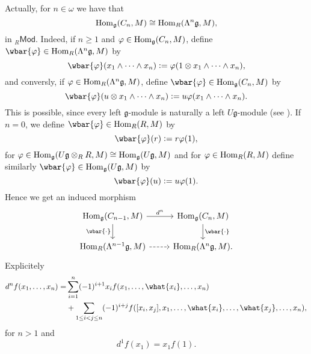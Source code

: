 \begin{remark}
	Actually, for $n \in \omega$ we have that 
	\begin{equation*}
		\operatorname{Hom}_\mathfrak{g}(C_n,M) \cong \operatorname{Hom}_R(\Lambda^n \mathfrak{g},M),
	\end{equation*}
	\noindent in $_{R}\mathsf{Mod}$. Indeed, if $n \geq 1$ and $\varphi \in \operatorname{Hom}_\mathfrak{g}(C_n,M)$, define $\wbar{\varphi} \in \Hom_R(\Lambda^n \mathfrak{g},M)$ by 
	\begin{equation*}
		\wbar{\varphi}(x_1 \wedge \dots \wedge x_n) := \varphi(1 \otimes x_1 \wedge \dots \wedge x_n),
	\end{equation*}
	\noindent and conversly, if $\varphi \in \operatorname{Hom}_R(\Lambda^n \mathfrak{g},M)$, define $\wbar{\varphi} \in \Hom_\mathfrak{g}(C_n,M)$ by
	\begin{equation*}
		\wbar{\varphi}(u \otimes x_1 \wedge \dots \wedge x_n) := u \varphi(x_1 \wedge \dots \wedge x_n).
	\end{equation*}
	\noindent This is possible, since every left $\mathfrak{g}$-module is naturally a left $U\mathfrak{g}$-module (see \cite[224--225]{weibel:homological_algebra:1994}). If $n = 0$, we define $\wbar{\varphi} \in \Hom_R(R,M)$ by 
	\begin{equation*}
		\wbar{\varphi}(r) := r\varphi(1),
	\end{equation*}
	\noindent for $\varphi \in \operatorname{Hom}_\mathfrak{g}(U\mathfrak{g} \otimes_R R,M) \cong \operatorname{Hom}_\mathfrak{g}(U\mathfrak{g},M)$ and for $\varphi \in \operatorname{Hom}_R(R,M)$ define similarly $\wbar{\varphi} \in \Hom_\mathfrak{g}(U\mathfrak{g},M)$ by
	\begin{equation*}
		\wbar{\varphi}(u) := u\varphi(1).
	\end{equation*}
	Hence we get an induced morphism 
	\begin{equation*}
		\begin{tikzcd}
			\Hom_\mathfrak{g}(C_{n - 1},M) \arrow[r,"d^n"]\arrow[d,"\wbar{\cdot}"'] & \Hom_\mathfrak{g}(C_n,M)\arrow[d,"\wbar{\cdot}"]\\
			\Hom_R(\Lambda^{n - 1}\mathfrak{g},M) \arrow[r,dashed] & \Hom_R(\Lambda^n\mathfrak{g},M).
		\end{tikzcd}
	\end{equation*}
	Explicitely
	\begin{align*}
		d^nf(x_1,\dots,x_n) =& \sum_{i = 1}^n(-1)^{i + 1}x_i f(x_1,\dots,\what{x_i},\dots,x_n)\\
		&+ \sum_{1 \leq i < j \leq n}(-1)^{i + j} f([x_i,x_j],x_1,\dots,\what{x_i},\dots,\what{x_j},\dots,x_n),
	\end{align*}
	\noindent for $n > 1$ and 
	\begin{equation*}
		d^1f(x_1) = x_1f(1).
	\end{equation*}
\end{remark}

